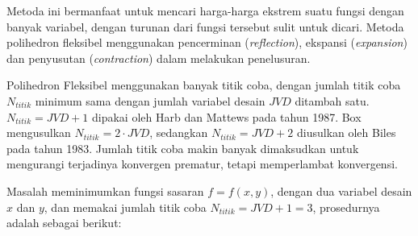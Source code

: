 Metoda ini bermanfaat untuk mencari harga-harga ekstrem suatu fungsi
dengan banyak variabel, dengan turunan dari fungsi tersebut sulit untuk
dicari. Metoda polihedron fleksibel menggunakan pencerminan
(\textit{reflection}), ekspansi (\textit{expansion}) dan penyusutan
(\textit{contraction}) dalam melakukan penelusuran.

Polihedron Fleksibel menggunakan banyak titik coba, dengan jumlah titik
coba $N_{titik}$ minimum sama dengan jumlah variabel desain $JVD$
ditambah satu. $N_{titik} = JVD+1$ dipakai oleh Harb dan Mattews pada
tahun 1987. Box mengusulkan $N_{titik} = 2 \cdot JVD$, sedangkan
$N_{titik} = JVD+2$ diusulkan oleh Biles pada tahun 1983. Jumlah titik
coba makin banyak dimaksudkan untuk mengurangi terjadinya konvergen
prematur, tetapi memperlambat konvergensi.

Masalah meminimumkan fungsi sasaran $f=f(x,y)$, dengan dua variabel
desain $x$ dan $y$, dan memakai jumlah titik coba $N_{titik} = JVD+1 = 3$,
prosedurnya adalah sebagai berikut:
